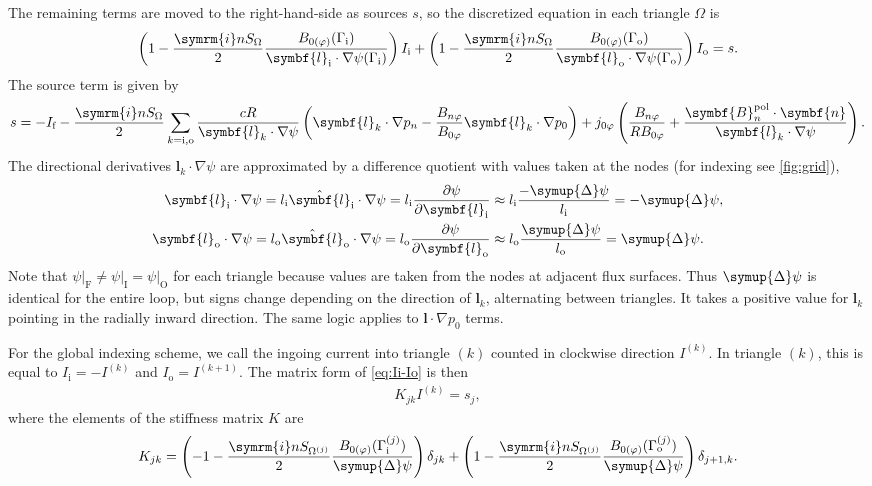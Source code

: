 \documentclass[a4paper, 10pt, english]{article}
\let\temp\varrho
\let\varrho\rho
\let\rho\temp
\let\temp\vartheta
\let\vartheta\theta
\let\theta\temp
\let\temp\varphi
\let\varphi\phi
\let\phi\temp
\let\vec\symbf
\newcommand*\im{\ensuremath{\symrm{i}}}  %
\newcommand*\pd[2][]{\ensuremath{\frac{\partial #1}{\partial #2}}}  %
\newcommand*\pol{\ensuremath{\textrm{pol}}}  %
\newcommand*\fs{\ensuremath{\textrm{f}}}  %
\newcommand*\inw{\ensuremath{\textrm{i}}}  %
\newcommand*\out{\ensuremath{\textrm{o}}}  %
\newcommand*\vfs{\ensuremath{\textrm{F}}}  %
\newcommand*\vinw{\ensuremath{\textrm{I}}}  %
\newcommand*\vout{\ensuremath{\textrm{O}}}  %
\begin{document}
The remaining terms are moved to the right-hand-side as sources $s$, so the discretized equation in each triangle $\Omega$ is
\begin{gather}
  \left( 1 - \frac{\im n S_{\Omega}}{2} \frac{B_{0 (\phi)} (\Gamma_{\inw})}{\vec{l}_{\inw} \cdot \nabla \psi (\Gamma_{\inw})} \right) I_{\inw} + \left( 1 - \frac{\im n S_{\Omega}}{2} \frac{B_{0 (\phi)} (\Gamma_{\out})}{\vec{l}_{\out} \cdot \nabla \psi (\Gamma_{\out})} \right) I_{\out} = s. \label{eq:Ii-Io}
\end{gather}
The source term is given by
\begin{gather}
  s = -I_{\fs} - \frac{\im n S_{\Omega}}{2} \sum_{k = \inw, \out} \frac{c R}{\vec{l}_{k} \cdot \nabla \psi} \left( \vec{l}_{k} \cdot \nabla p_{n} - \frac{B_{n \phi}}{B_{0 \phi}} \vec{l}_{k} \cdot \nabla p_{0} \right) + j_{0 \phi} \left( \frac{B_{n \phi}}{R B_{0 \phi}} + \frac{\vec{B}_{n}^{\pol} \cdot \vec{n}}{\vec{l}_{k} \cdot \nabla \psi} \right).
\end{gather}
The directional derivatives $\vec{l}_{k} \cdot \nabla \psi$ are approximated by a difference quotient with values taken at the nodes (for indexing see \cref{fig:grid}),
\begin{align}
  \vec{l}_{\inw} \cdot \nabla \psi = l_{\inw} \hat{\vec{l}}_{\inw} \cdot \nabla \psi = l_{\inw} \pd[\psi]{\vec{l}_{\inw}} & \approx l_{\inw} \frac{-\symup{\Delta} \psi}{l_{\inw}} = -\symup{\Delta} \psi, \\
  \vec{l}_{\out} \cdot \nabla \psi = l_{\out} \hat{\vec{l}}_{\out} \cdot \nabla \psi = l_{\out} \pd[\psi]{\vec{l}_{\out}} & \approx l_{\out} \frac{\symup{\Delta} \psi}{l_{\out}} = \symup{\Delta} \psi.
\end{align}
Note that $\psi \vert_{\vfs} \neq \psi \vert_{\vinw} = \psi \vert_{\vout}$ for each triangle because values are taken from the nodes at adjacent flux surfaces. Thus $\symup{\Delta} \psi$ is identical for the entire loop, but signs change depending on the direction of $\vec{l}_{k}$, alternating between triangles. It takes a positive value for $\vec{l}_{k}$ pointing in the radially inward direction. The same logic applies to $\vec{l} \cdot \nabla p_{0}$ terms.

For the global indexing scheme, we call the ingoing current into triangle $(k)$ counted in clockwise direction $I^{(k)}$. In triangle $(k)$, this is equal to $I_{\inw} = -I^{(k)}$ and $I_{\out} = I^{(k+1)}$. The matrix form of \cref{eq:Ii-Io} is then
\begin{gather}
  K_{jk} I^{(k)} = s_{j},
\end{gather}
where the elements of the stiffness matrix $K$ are
\begin{gather}
  K_{jk} = \left( -1 - \frac{\im n S_{\Omega^{(j)}}}{2} \frac{B_{0 (\phi)} (\Gamma_{\inw}^{(j)})}{\symup{\Delta} \psi} \right) \delta_{jk} + \left( 1 - \frac{\im n S_{\Omega^{(j)}}}{2} \frac{B_{0 (\phi)} (\Gamma_{\out}^{(j)})}{\symup{\Delta} \psi} \right) \delta_{j+1, k}.
\end{gather}
\end{document}
